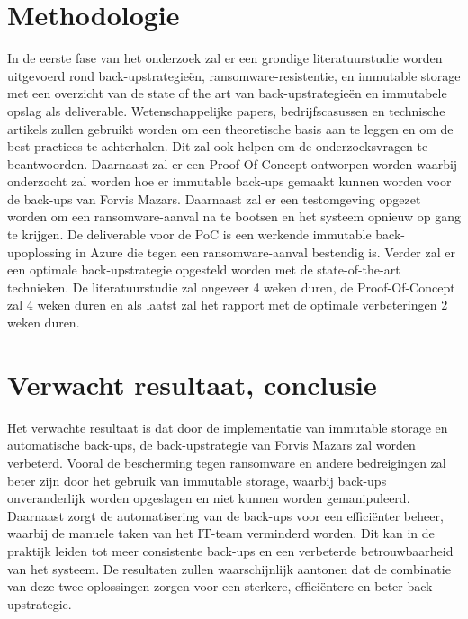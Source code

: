 \section{Methodologie}%
\label{sec:methodologie}
In de eerste fase van het onderzoek zal er een grondige literatuurstudie worden uitgevoerd rond back-upstrategieën, ransomware-resistentie, en immutable storage met een overzicht van de state of the art van back-upstrategieën en immutabele opslag als deliverable. Wetenschappelijke papers, bedrijfscasussen en technische artikels zullen gebruikt worden om een theoretische basis aan te leggen en om de best-practices te achterhalen. Dit zal ook helpen om de onderzoeksvragen te beantwoorden. Daarnaast zal er een Proof-Of-Concept ontworpen worden waarbij onderzocht zal worden hoe er immutable back-ups gemaakt kunnen worden voor de back-ups van Forvis Mazars.  Daarnaast zal er een testomgeving opgezet worden om een ransomware-aanval na te bootsen en het systeem opnieuw op gang te krijgen. De deliverable voor de PoC is een werkende immutable back-upoplossing in Azure die tegen een ransomware-aanval bestendig is. Verder zal er een optimale back-upstrategie opgesteld worden met de state-of-the-art technieken. De literatuurstudie zal ongeveer 4 weken duren, de Proof-Of-Concept zal 4 weken duren en als laatst zal het rapport met de optimale verbeteringen 2 weken duren.

\section{Verwacht resultaat, conclusie}%
\label{sec:verwachte_resultaten}
Het verwachte resultaat is dat door de implementatie van immutable storage en automatische back-ups, de back-upstrategie van Forvis Mazars zal worden verbeterd. Vooral de bescherming tegen ransomware en andere bedreigingen zal beter zijn door het gebruik van immutable storage, waarbij back-ups onveranderlijk worden opgeslagen en niet kunnen worden gemanipuleerd. Daarnaast zorgt de automatisering van de back-ups voor een efficiënter beheer, waarbij de manuele taken van het IT-team verminderd worden. Dit kan in de praktijk leiden tot meer consistente back-ups en een verbeterde betrouwbaarheid van het systeem. De resultaten zullen waarschijnlijk aantonen dat de combinatie van deze twee oplossingen zorgen voor een sterkere, efficiëntere en beter back-upstrategie.

